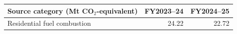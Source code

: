 \begin{tabular}{@{}p{.46\linewidth}rr@{}}\toprule
Source category (Mt CO$_2$-equivalent) & FY2023--24 & FY2024--25\\\midrule
Residential fuel combustion & 24.22 & 22.72 \\
\bottomrule\end{tabular}
